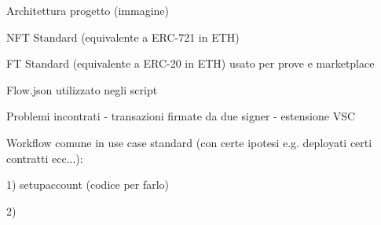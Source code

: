 Architettura progetto (immagine)

NFT Standard (equivalente a ERC-721 in ETH)

FT Standard (equivalente a ERC-20 in ETH) usato per prove e marketplace

Flow.json utilizzato negli script

Problemi incontrati 
 - transazioni firmate da due signer
 - estensione VSC

Workflow comune in use case standard (con certe ipotesi e.g. deployati certi contratti ecc...):

1) setupaccount (codice per farlo)

2) 



